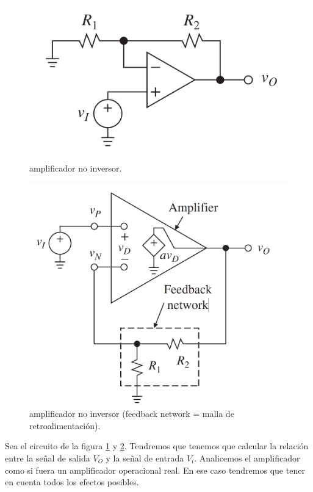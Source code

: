 \documentclass[11pt]{article} %
\begin{document}
\begin{figure}[h!] \centering
\includegraphics[scale=0.25]{1.3-Amplificador-inversor.png}
\caption{amplificador no inversor.}
\label{Fig:1.3-Amplificador-inversor}
\end{figure}


\begin{figure}[h!] \centering
\includegraphics[scale=0.3]{1.3-Amplificador-inversor-2.png}
\caption{amplificador no inversor (feedback network = malla de retroalimentación).}
\label{Fig:1.3-Amplificador-inversor-2}
\end{figure}


Sea el circuito de la figura \ref{Fig:1.3-Amplificador-inversor} y \ref{Fig:1.3-Amplificador-inversor-2}. Tendremos que tenemos que calcular la relación entre la señal de salida $V_O$ y la señal de entrada $V_i$. Analicemos el amplificador como si fuera un amplificador operacional real. En ese caso tendremos que tener en cuenta todos los efectos posibles. \\
\end{document}

